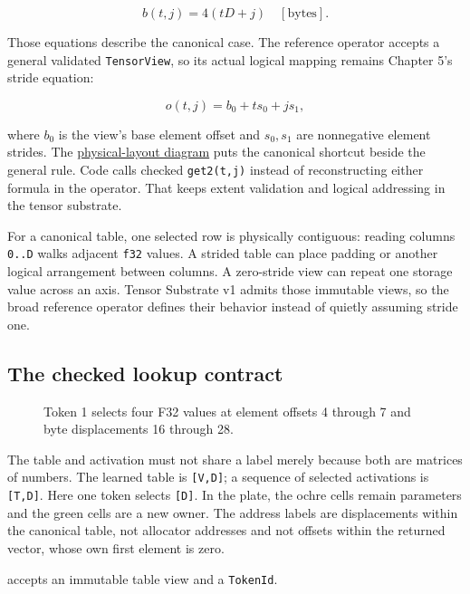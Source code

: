 \documentclass[
  10pt,
]{article}
\begin{document}
\[
b(t,j)=4(tD+j)\quad[\mathrm{bytes}].
\]

Those equations describe the canonical case. The reference operator
accepts a general validated \texttt{TensorView}, so its actual logical
mapping remains Chapter 5's stride equation:

\[
o(t,j)=b_0+t s_0+j s_1,
\]

where \(b_0\) is the view's base element offset and \(s_0,s_1\) are
nonnegative element strides. The
\href{https://github.com/hermonai/inside-the-llm-engine/blob/astra-visual-rewrite/diagrams/transformer/embedding-physical-layout.txt}{physical-layout
diagram} puts the canonical shortcut beside the general rule. Code calls
checked \texttt{get2(t,j)} instead of reconstructing either formula in
the operator. That keeps extent validation and logical addressing in the
tensor substrate.

For a canonical table, one selected row is physically contiguous:
reading columns \texttt{0..D} walks adjacent \texttt{f32} values. A
strided table can place padding or another logical arrangement between
columns. A zero-stride view can repeat one storage value across an axis.
Tensor Substrate v1 admits those immutable views, so the broad reference
operator defines their behavior instead of quietly assuming stride one.

\subsection{The checked lookup
contract}\label{the-checked-lookup-contract}

\begin{figure}[H]\centering\resizebox{\linewidth}{!}{}\caption{Token 1 selects four F32 values at element offsets 4 through 7 and byte displacements 16 through 28.}\end{figure}

The table and activation must not share a label merely because both are
matrices of numbers. The learned table is \texttt{{[}V,D{]}}; a sequence
of selected activations is \texttt{{[}T,D{]}}. Here one token selects
\texttt{{[}D{]}}. In the plate, the ochre cells remain parameters and
the green cells are a new owner. The address labels are displacements
within the canonical table, not allocator addresses and not offsets
within the returned vector, whose own first element is zero.

\texttt{} accepts an immutable
table view and a \texttt{TokenId}.
\end{document}
